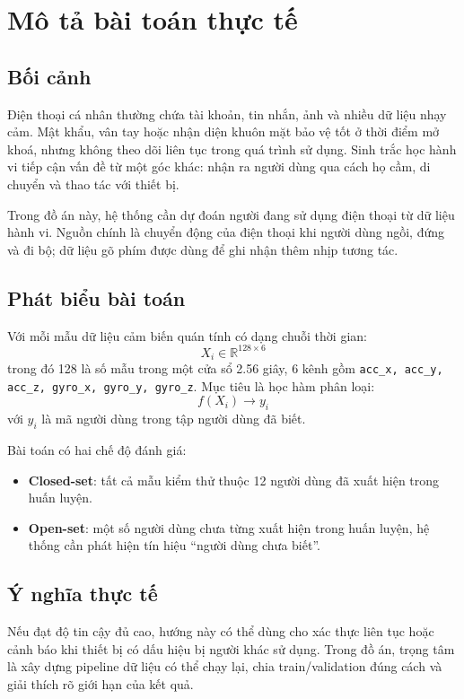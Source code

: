 \documentclass[12pt,a4paper]{article}
\begin{document}
\newpage

\section{Mô tả bài toán thực tế}

\subsection{Bối cảnh}

Điện thoại cá nhân thường chứa tài khoản, tin nhắn, ảnh và nhiều dữ liệu nhạy cảm. Mật khẩu, vân tay hoặc nhận diện khuôn mặt bảo vệ tốt ở thời điểm mở khoá, nhưng không theo dõi liên tục trong quá trình sử dụng. Sinh trắc học hành vi tiếp cận vấn đề từ một góc khác: nhận ra người dùng qua cách họ cầm, di chuyển và thao tác với thiết bị.

Trong đồ án này, hệ thống cần dự đoán người đang sử dụng điện thoại từ dữ liệu hành vi. Nguồn chính là chuyển động của điện thoại khi người dùng ngồi, đứng và đi bộ; dữ liệu gõ phím được dùng để ghi nhận thêm nhịp tương tác.

\subsection{Phát biểu bài toán}

Với mỗi mẫu dữ liệu cảm biến quán tính có dạng chuỗi thời gian:
\[
X_i \in \mathbb{R}^{128 \times 6}
\]
trong đó 128 là số mẫu trong một cửa sổ 2.56 giây, 6 kênh gồm \texttt{acc\_x, acc\_y, acc\_z, gyro\_x, gyro\_y, gyro\_z}. Mục tiêu là học hàm phân loại:
\[
f(X_i) \rightarrow y_i
\]
với \(y_i\) là mã người dùng trong tập người dùng đã biết.

Bài toán có hai chế độ đánh giá:

\begin{itemize}
    \item \textbf{Closed-set}: tất cả mẫu kiểm thử thuộc 12 người dùng đã xuất hiện trong huấn luyện.
    \item \textbf{Open-set}: một số người dùng chưa từng xuất hiện trong huấn luyện, hệ thống cần phát hiện tín hiệu ``người dùng chưa biết''.
\end{itemize}

\subsection{Ý nghĩa thực tế}

Nếu đạt độ tin cậy đủ cao, hướng này có thể dùng cho xác thực liên tục hoặc cảnh báo khi thiết bị có dấu hiệu bị người khác sử dụng. Trong đồ án, trọng tâm là xây dựng pipeline dữ liệu có thể chạy lại, chia train/validation đúng cách và giải thích rõ giới hạn của kết quả.
\end{document}

